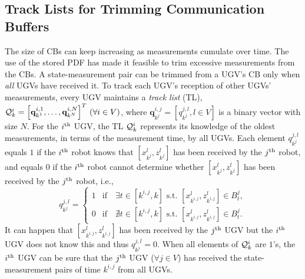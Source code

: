 	
	
	\subsection{Track Lists for Trimming Communication Buffers}\label{subsec:tracklist}
	The size of CBs can keep increasing as measurements cumulate over time. 
	The use of the stored PDF has made it feasible to trim excessive measurements from the CBs.
	A state-measurement pair can be trimmed from a UGV's CB only when \textit{all} UGVs have received it.
	To track each UGV's reception of other UGVs' measurements, every UGV maintains a \textit{track list} (TL), $\mathcal{Q}^i_k=\left[\mathbf{q}^{i,1}_{k^1},\dots, \mathbf{q}^{i,N}_{k^N}\right]^T \,(\forall i\in V)$, where $\mathbf{q}^{i,j}_{k^j}=\left[q^{j,l}_{k^{j}}, l\in V\right]$ is a binary vector with size $N$.
	For the $i^\text{th}$ UGV, the TL $\mathcal{Q}^i_k$ represents its knowledge of the oldest measurements, in terms of the measurement time, by all UGVs.	
	Each element $q^{j,l}_{k^{j}}$ equals $1$ if the $i^\text{th}$ robot knows that $\left[x^l_{k^{j}},z^l_{k^{j}}\right]$ has been received by the $j^\text{th}$ robot, and equals $0$ if the $i^\text{th}$ robot cannot determine whether $\left[x^l_{k^{j}},z^l_{k^{j}}\right]$ has been received by the $j^\text{th}$ robot, i.e.,
	\begin{equation*}
	q^{j,l}_{k^{j}}=
	\begin{cases}
	1 & \text{if}\quad \exists t\in\left[k^{i,j}, k\right] \text{ s.t. } \left[x^l_{k^{i,j}},z^l_{k^{i,j}}\right]\in B^j_t,\\
	0 & \text{if}\quad \nexists t\in\left[k^{i,j}, k\right] \text{ s.t. } \left[x^l_{k^{i,j}},z^l_{k^{i,j}}\right]\in B^j_t.
	\end{cases}
	\end{equation*}
	It can happen that $\left[x^l_{k^{i,j}},z^l_{k^{i,j}}\right]$ has been received by the $j^\text{th}$ UGV but the $i^\text{th}$ UGV does not know this and thus $q^{j,l}_{k^{j}}=0$.
	When all elements of $\mathcal{Q}^i_k$ are $1$'s, the $i^\text{th}$ UGV can be sure that the $j^\text{th}$ UGV ($\forall j\in V$) has received the state-measurement pairs of time $k^{i,j}$ from all UGVs.
	
